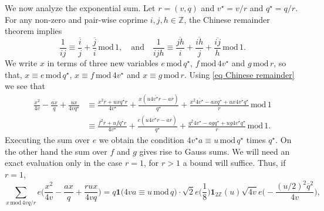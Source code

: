 \documentclass[12pt,reqno]{amsart}
\theoremstyle{plain}
\numberwithin{equation}{section}
\numberwithin{figure}{section}
\theoremstyle{plain}
\theoremstyle{definition}
\theoremstyle{remark}
\newcommand{\mmod}{\,\mathrm{mod}\,}
\begin{document}
We now analyze the exponential sum. 
Let $r = (v,q)$ and $v^{\star} = v / r$ and $q^{\star} = q / r$. 
For any non-zero 
and pair-wise coprime $i,j,h\in \mathbb{Z}$, 
the Chinese remainder theorem implies 
\begin{equation}\label{eq Chinese remainder}
\frac{1}{ij} \equiv 
\frac{\overline{i}}{j} + \frac{\overline{j}}{i} \mmod{1},
\quad \mathrm{and}\quad
\frac{1}{ijh} \equiv 
\frac{\overline{jh}}{i} + \frac{\overline{ih}}{j} +
\frac{\overline{ij}}{h} \mmod{1}.
\end{equation}
We write $x$ 
in terms of three new variables $e \mmod{q^{\star}}$, $f \mmod{4 v^{\star}}$ and $g \mmod{r}$, so that, 
$x \equiv e \mmod{q^{\star}}$, $x \equiv f \mmod{4v^{\star}}$ and $x \equiv g \mmod{r}$. Using \eqref{eq Chinese remainder}
we see that
\begin{align*}
  \frac{x^2}{4 v} - \frac{a x}{q} + \frac{u x}{4v q^{\star}} & \equiv \frac{x^2 \overline{r} + u x \overline{q^{\star} r}}{4 v^{\star}} + \frac{x (u \overline{4 v^{\star} r} - a \overline{r})}{q^{\star}} + \frac{x^2 \overline{4 v^{\star}} - a x \overline{q^{\star}} + u x \overline{4 v^{\star} q^{\star}}}{r}  \mmod{1}
  \\ & \equiv \frac{f^2 \overline{r} + u f \overline{q^{\star} r}}{4 v^{\star}} + \frac{e (u \overline{4 v^{\star} r} - a \overline{r})}{q^{\star}} + \frac{g^2 \overline{4 v^{\star}} - a g \overline{q^{\star}} + u g \overline{4 v^{\star} q^{\star}}}{r} \mmod{1}.
\end{align*}
Executing the sum over $e$ we obtain the condition $4 v^{\star} a \equiv u \mmod {q^{\star}}$
times $q^{\star}$. On the other hand the sum over $f$ and $g$ gives rise to Gauss sums. We will need an exact evaluation 
only in the case $r = 1$, for $r > 1$ a bound will suffice. Thus, if $r = 1$, 
$$
\sum_{x \mmod{4v q / r}} 
e \Big ( \frac{x^2}{4 v} - \frac{a x}{q} 
+ \frac{r u x}{4 v q}  \Big ) = q \mathbf{1} \Big ( 4 v a \equiv u \mmod{q} \Big ) \cdot \sqrt{2} e \Big ( \frac{1}{8} \Big ) \mathbf{1}_{2 \mathbb{Z}}(u) \sqrt{4 v} e \Big ( - \frac{(u / 2)^2 \overline{q}^2}{4 v} \Big ), 
$$
\end{document}
